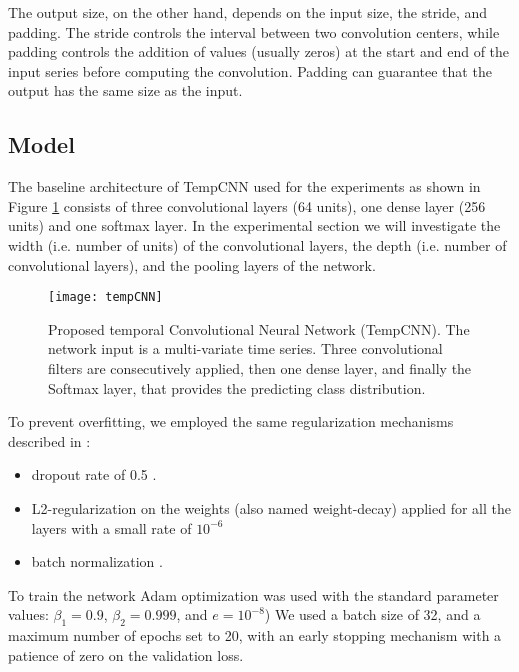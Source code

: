 The output size, on the other hand, depends on the input size, the stride, and padding.
The stride controls the interval between two convolution centers, while padding controls the addition of values (usually zeros) at the start and end of the input series before computing the convolution. 
Padding can guarantee that the output has the same size as the input.


\subsection{Model}

The baseline architecture of TempCNN used for the experiments as shown in Figure \ref{fig:temCNNArchitecture} consists of three convolutional layers (64 units), one dense layer (256 units) and one softmax layer.
In the experimental section we will investigate the width (i.e. number of units) of the convolutional layers, the depth (i.e. number of convolutional layers), and the pooling layers of the network.

\begin{figure}[H]
  \centering
  \texttt{[image: tempCNN]}
  \caption{Proposed temporal Convolutional Neural Network (TempCNN). The network input is a
  multi-variate time series. Three convolutional filters are consecutively applied, then one dense layer,
  and finally the Softmax layer, that provides the predicting class distribution.    \cite{tempCNN}}
  \label{fig:temCNNArchitecture}
\end{figure}


To prevent overfitting, we employed the same regularization mechanisms described in \cite{tempCNN}:

\begin{itemize}
  \item dropout rate of 0.5 \cite{JMLR:v15:srivastava14a}. 
  \item L2-regularization on the weights (also named weight-decay) applied for all the layers with a small rate of $10^{-6}$ 
  \item batch normalization \cite{DBLP:journals/corr/IoffeS15}.
\end{itemize}

To train the network Adam optimization was used with the standard parameter values: $\beta_1 = 0.9$, $\beta_2 = 0.999$, and $e = 10^{-8}$) \cite{kingma2014adam} 
We used a batch size of 32, and a maximum number of epochs set to 20, with an early stopping mechanism with a patience of zero on the validation loss. 


